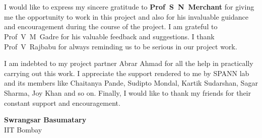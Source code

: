 \chapter*{}
I would like to express my sincere gratitude to \textbf{Prof~S~N~Merchant}
for giving me the opportunity to work in this project and also for his
invaluable guidance and encouragement during the course of the project. I am
grateful to Prof~V~M~Gadre for his valuable feedback and suggestions. I thank
Prof~V~Rajbabu for always reminding us to be serious in our project work.

I am indebted to my project partner Abrar Ahmad 
for all the help in practically carrying out this work. I appreciate the 
support rendered to me by SPANN lab and its members like Chaitanya Pande, 
Sudipto Mondal, Kartik Sudarshan, Sagar Sharma, Joy Khan and so on. Finally,
I would like to thank my friends for their constant support and
encouragement.

\vspace{1.5cm}

\begin{flushright}
\textbf{Swrangsar Basumatary} \\
IIT Bombay
\end{flushright}